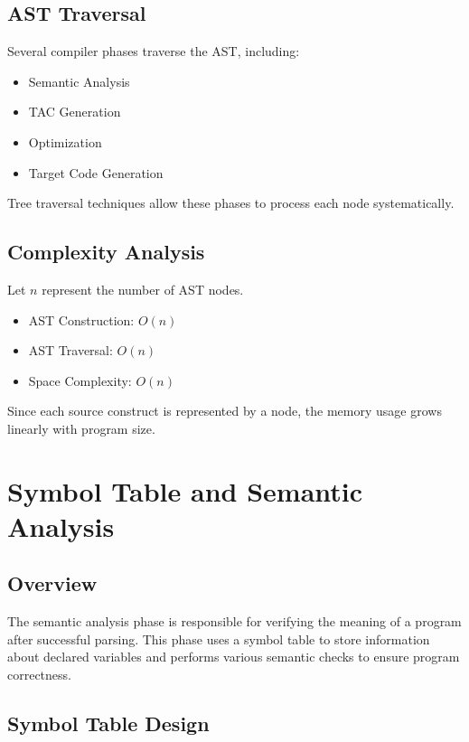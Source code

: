 \documentclass[12pt,a4paper]{report}
\begin{document}
\section{AST Traversal}

Several compiler phases traverse the AST, including:

\begin{itemize}
    \item Semantic Analysis
    \item TAC Generation
    \item Optimization
    \item Target Code Generation
\end{itemize}

Tree traversal techniques allow these phases to process each node systematically.

\section{Complexity Analysis}

Let \(n\) represent the number of AST nodes.

\begin{itemize}
    \item AST Construction: \(O(n)\)
    \item AST Traversal: \(O(n)\)
    \item Space Complexity: \(O(n)\)
\end{itemize}

Since each source construct is represented by a node, the memory usage grows linearly with program size.

\chapter{Symbol Table and Semantic Analysis}

\section{Overview}

The semantic analysis phase is responsible for verifying the meaning of a program after successful parsing. This phase uses a symbol table to store information about declared variables and performs various semantic checks to ensure program correctness.

\section{Symbol Table Design}
\end{document}
